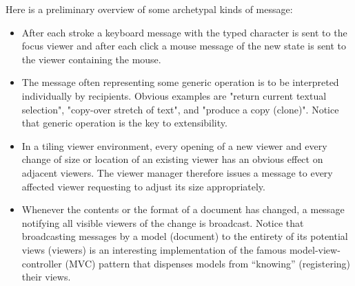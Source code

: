 Here is a preliminary overview of some archetypal kinds of message:
\begin{itemize}
  \item After each stroke a keyboard message with the typed character is sent to the focus viewer
    and after each click a mouse message of the new state is sent to the viewer containing the mouse.
  \item The message often representing some generic operation is to be interpreted individually
    by recipients. Obvious examples are "return current textual selection", "copy-over stretch
    of text", and "produce a copy (clone)". Notice that generic operation is the key to extensibility.
  \item In a tiling viewer environment, every opening of a new viewer and every change of size
    or location of an existing viewer has an obvious effect on adjacent viewers. The viewer manager
    therefore issues a message to every affected viewer requesting to adjust its size appropriately.
  \item Whenever the contents or the format of a document has changed, a message notifying
    all visible viewers of the change is broadcast. Notice that broadcasting messages by a model (document)
    to the entirety of its potential views (viewers) is an interesting implementation of the famous
    model-view-controller (MVC) pattern that dispenses models from “knowing” (registering) their views.
\end{itemize}
